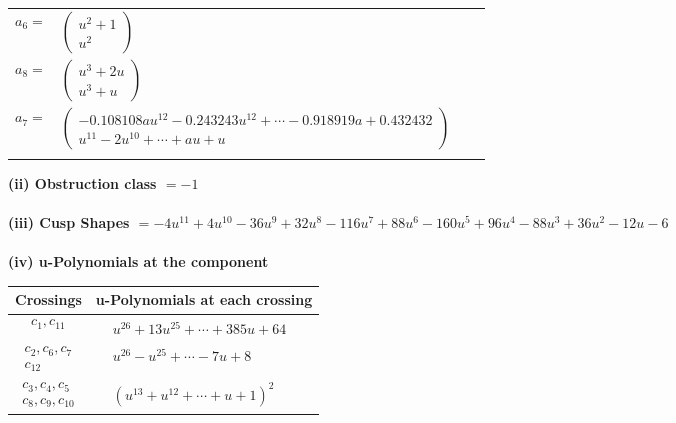 \documentclass[1p]{elsarticle_modified}
\theoremstyle{definition}
\begin{document}
\begin{tabular}{m{7pt} m{180pt} m{7pt} m{180pt} }
\flushright $a_{6}=$&$\begin{pmatrix}u^2+1\\u^2\end{pmatrix}$ \\
\flushright $a_{8}=$&$\begin{pmatrix}u^3+2 u\\u^3+u\end{pmatrix}$ \\
\flushright $a_{7}=$&$\begin{pmatrix}-0.108108 a u^{12}-0.243243 u^{12}+\cdots-0.918919 a+0.432432\\u^{11}-2 u^{10}+\cdots+a u+u\end{pmatrix}$\\&\end{tabular}
\flushleft \textbf{(ii) Obstruction class $= -1$}\\~\\
\flushleft \textbf{(iii) Cusp Shapes $= -4 u^{11}+4 u^{10}-36 u^9+32 u^8-116 u^7+88 u^6-160 u^5+96 u^4-88 u^3+36 u^2-12 u-6$}\\~\\
\newpage\renewcommand{\arraystretch}{1}
\flushleft \textbf{(iv) u-Polynomials at the component}\newline \\
\begin{tabular}{m{50pt}|m{274pt}}
Crossings & \hspace{64pt}u-Polynomials at each crossing \\
\hline $$\begin{aligned}c_{1},c_{11}\end{aligned}$$&$\begin{aligned}
&u^{26}+13 u^{25}+\cdots+385 u+64
\end{aligned}$\\
\hline $$\begin{aligned}c_{2},c_{6},c_{7}\\c_{12}\end{aligned}$$&$\begin{aligned}
&u^{26}- u^{25}+\cdots-7 u+8
\end{aligned}$\\
\hline $$\begin{aligned}c_{3},c_{4},c_{5}\\c_{8},c_{9},c_{10}\end{aligned}$$&$\begin{aligned}
&(u^{13}+u^{12}+\cdots+u+1)^{2}
\end{aligned}$\\
\hline
\end{tabular}\\~\\
\end{document}
